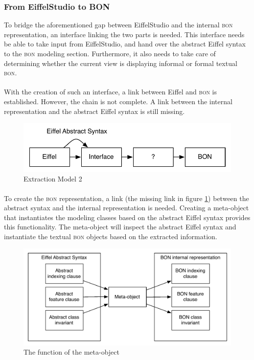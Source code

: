 \subsubsection{From EiffelStudio to BON}
To bridge the aforementioned gap between EiffelStudio and the internal \textsc{bon} representation, an interface linking the two parts is needed. This interface needs be able to take input from EiffelStudio, and hand over the abstract Eiffel syntax to the \textsc{bon} modeling section. Furthermore, it also needs to take care of determining whether the current view is displaying informal or formal textual \textsc{bon}.

\paragraph{}
With the creation of such an interface, a link between Eiffel and \textsc{bon} is established. However, the chain is not complete. A link between the internal representation \bon{} and the abstract Eiffel syntax is still missing.
\begin{figure}[H]
\centering
\includegraphics[scale=0.8]{images/BON-extraction-model-2.pdf}
\caption{\bon{} Extraction Model 2}
\label{fig:bon_extraction_2}
\end{figure}

\paragraph{}
To create the \textsc{bon} representation, a link (the missing link in figure \ref{fig:bon_extraction_2}) between the abstract syntax and the internal representation is needed. Creating a meta-object that instantiates the modeling classes based on the abstract Eiffel syntax provides this functionality. The meta-object will inspect the abstract Eiffel syntax and instantiate the textual \textsc{bon} objects based on the extracted information.

\begin{figure}[H]
\centering
\includegraphics[scale=0.8]{images/metaobject.pdf}
\caption{The function of the \bon{} meta-object}
\label{fig:bon-meta-object}
\end{figure}

